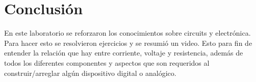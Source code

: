 \documentclass[stu, 12pt, letterpaper, donotrepeattitle, floatsintext, natbib, helv]{apa7}
\begin{document}
\section{Conclusión}
En este laboratorio se reforzaron los conocimientos sobre circuits y electrónica. Para hacer esto se resolvieron ejercicios y se resumió un video. Esto para fin de entender la relación que hay entre corriente, voltaje y resistencia, además de todos los diferentes componentes y aspectos que son requeridos al construir/arreglar algún dispositivo digital o analógico.
\newpage
\renewcommand\refname{\large\textbf{Referencias}}

\end{document}
